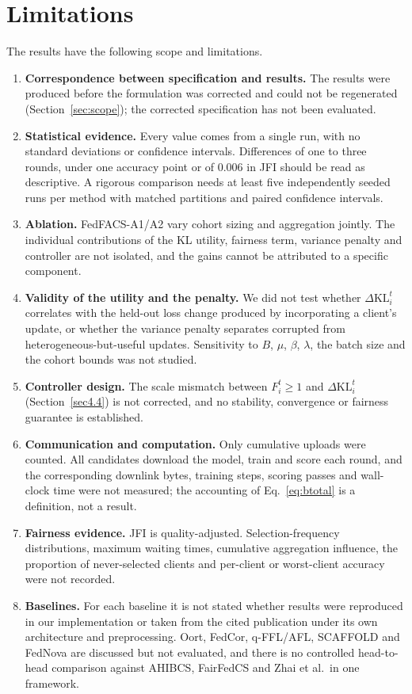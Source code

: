 \documentclass[pdflatex,sn-basic]{sn-jnl}
\newcommand{\KL}{\Delta\mathrm{KL}}
\begin{document}
\section{Limitations}\label{sec:limits}
The results have the following scope and limitations.
\begin{enumerate}
\item \textbf{Correspondence between specification and results.} The results were produced before the formulation was corrected and could not be regenerated (Section~\ref{sec:scope}); the corrected specification has not been evaluated.
\item \textbf{Statistical evidence.} Every value comes from a single run, with no standard deviations or confidence intervals. Differences of one to three rounds, under one accuracy point or of 0.006 in JFI should be read as descriptive. A rigorous comparison needs at least five independently seeded runs per method with matched partitions and paired confidence intervals.
\item \textbf{Ablation.} FedFACS-A1/A2 vary cohort sizing and aggregation jointly. The individual contributions of the KL utility, fairness term, variance penalty and controller are not isolated, and the gains cannot be attributed to a specific component.
\item \textbf{Validity of the utility and the penalty.} We did not test whether $\KL_i^t$ correlates with the held-out loss change produced by incorporating a client's update, or whether the variance penalty separates corrupted from heterogeneous-but-useful updates. Sensitivity to $B$, $\mu$, $\beta$, $\lambda$, the batch size and the cohort bounds was not studied.
\item \textbf{Controller design.} The scale mismatch between $F_i^t\ge1$ and $\KL_i^t$ (Section~\ref{sec4.4}) is not corrected, and no stability, convergence or fairness guarantee is established.
\item \textbf{Communication and computation.} Only cumulative uploads were counted. All candidates download the model, train and score each round, and the corresponding downlink bytes, training steps, scoring passes and wall-clock time were not measured; the accounting of Eq.~\eqref{eq:btotal} is a definition, not a result.
\item \textbf{Fairness evidence.} JFI is quality-adjusted. Selection-frequency distributions, maximum waiting times, cumulative aggregation influence, the proportion of never-selected clients and per-client or worst-client accuracy were not recorded.
\item \textbf{Baselines.} For each baseline it is not stated whether results were reproduced in our implementation or taken from the cited publication under its own architecture and preprocessing. Oort, FedCor, q-FFL/AFL, SCAFFOLD and FedNova are discussed but not evaluated, and there is no controlled head-to-head comparison against AHIBCS, FairFedCS and Zhai et al.\ in one framework.

\end{enumerate}
\end{document}
